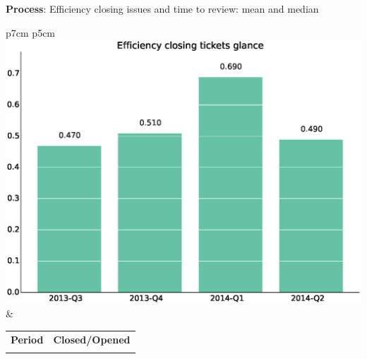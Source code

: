 \documentclass[a4wide,11pt]{report}
\begin{document}
\textbf{Process}: Efficiency closing issues and time to review: mean and median

\begin{tabular}{p{7cm} p{5cm}}
    \vspace{0pt} 
    \includegraphics[scale=.35]{figs/bmiglance.eps}
    & 
    \vspace{0pt}
    \begin{tabular}{l|l}%
    \bfseries Period & \bfseries Closed/Opened %
    \csvreader[head to column names]{data/bmiglance.csv}{}%
    {\\ & \bmi}
    \end{tabular}
\end{tabular}
\end{document}
